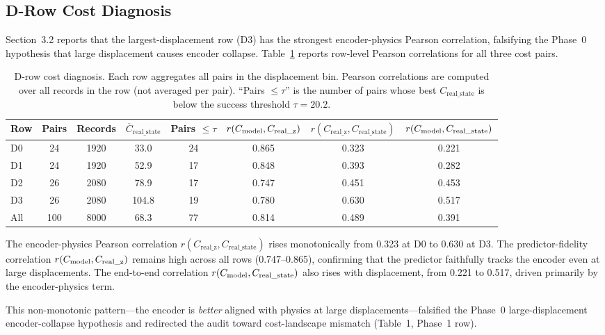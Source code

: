 \subsection{D-Row Cost Diagnosis}
\label{app:drow}

Section~3.2 reports that the largest-displacement row (D3) has the strongest
encoder-physics Pearson correlation, falsifying the Phase~0 hypothesis that
large displacement causes encoder collapse.
Table~\ref{tab:drow} reports row-level Pearson correlations for all three
cost pairs.

\begin{table}[h]
\centering
\caption{D-row cost diagnosis.  Each row aggregates all pairs in the
displacement bin.  Pearson correlations are computed over all records in the
row (not averaged per pair).  ``Pairs $\le\tau$'' is the number of pairs
whose best $C_\text{real\_state}$ is below the success threshold
$\tau = 20.2$.}
\label{tab:drow}
\begin{tabular}{lccccccc}
\toprule
Row & Pairs & Records & $\overline{C}_\text{real\_state}$ & Pairs $\le\tau$ & $r(C_\text{model}, C_\text{real\_z})$ & $r(C_\text{real\_z}, C_\text{real\_state})$ & $r(C_\text{model}, C_\text{real\_state})$ \\
\midrule
D0 & 24 & 1920 & 33.0 & 24 & 0.865 & 0.323 & 0.221 \\
D1 & 24 & 1920 & 52.9 & 17 & 0.848 & 0.393 & 0.282 \\
D2 & 26 & 2080 & 78.9 & 17 & 0.747 & 0.451 & 0.453 \\
D3 & 26 & 2080 & 104.8 & 19 & 0.780 & 0.630 & 0.517 \\
\midrule
All & 100 & 8000 & 68.3 & 77 & 0.814 & 0.489 & 0.391 \\
\bottomrule
\end{tabular}
\end{table}

The encoder-physics Pearson correlation $r(C_\text{real\_z},
C_\text{real\_state})$ rises monotonically from 0.323 at D0 to 0.630 at D3.
The predictor-fidelity correlation $r(C_\text{model}, C_\text{real\_z})$ remains
high across all rows (0.747--0.865), confirming that the predictor faithfully
tracks the encoder even at large displacements.  The end-to-end correlation
$r(C_\text{model}, C_\text{real\_state})$ also rises with displacement, from 0.221
to 0.517, driven primarily by the encoder-physics term.

This non-monotonic pattern---the encoder is \emph{better} aligned with
physics at large displacements---falsified the Phase~0 large-displacement
encoder-collapse hypothesis and redirected the audit toward cost-landscape
mismatch (Table~1, Phase~1 row).

